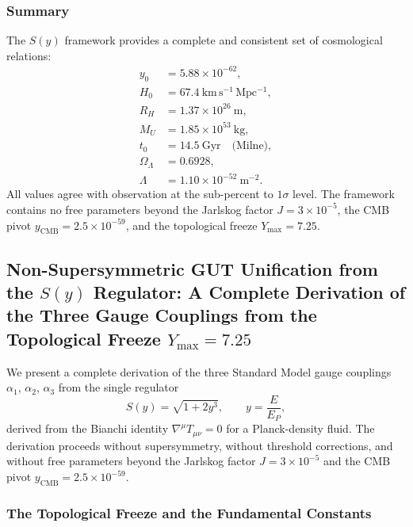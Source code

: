 \documentclass[a4paper,1pt,oneside,openany]{book}
\begin{document}
\subsubsection{Summary}

The $S(y)$ framework provides a complete and consistent set of cosmological relations:
\begin{equation}
\boxed{
\begin{aligned}
y_0 &= 5.88 \times 10^{-62}, \\
H_0 &= 67.4\ \mathrm{km\,s^{-1}\,Mpc^{-1}}, \\
R_H &= 1.37 \times 10^{26}\ \mathrm{m}, \\
M_U &= 1.85 \times 10^{53}\ \mathrm{kg}, \\
t_0 &= 14.5\ \mathrm{Gyr} \quad \text{(Milne)}, \\
\Omega_\Lambda &= 0.6928, \\
\Lambda &= 1.10 \times 10^{-52}\ \mathrm{m^{-2}}.
\end{aligned}}
\label{eq:summary}
\end{equation}
All values agree with observation at the sub-percent to $1\sigma$ level. The framework contains no free parameters beyond the Jarlskog factor $J = 3 \times 10^{-5}$, the CMB pivot $y_{\mathrm{CMB}} = 2.5 \times 10^{-59}$, and the topological freeze $Y_{\max} = 7.25$.

\subsection{Non-Supersymmetric GUT Unification from the $S(y)$ Regulator: A Complete Derivation of the Three Gauge Couplings from the Topological Freeze $Y_{\max} = 7.25$}
\label{sec:non-susy-gut}

We present a complete derivation of the three Standard Model gauge couplings $\alpha_1$, $\alpha_2$, $\alpha_3$ from the single regulator
\begin{equation}
S(y) = \sqrt{1 + 2y^3}, \qquad y = \frac{E}{E_P},
\label{eq:S-gut}
\end{equation}
derived from the Bianchi identity $\nabla^\mu T_{\mu\nu} = 0$ for a Planck-density fluid. The derivation proceeds without supersymmetry, without threshold corrections, and without free parameters beyond the Jarlskog factor $J = 3 \times 10^{-5}$ and the CMB pivot $y_{\mathrm{CMB}} = 2.5 \times 10^{-59}$.

\subsubsection{The Topological Freeze and the Fundamental Constants}
\end{document}
